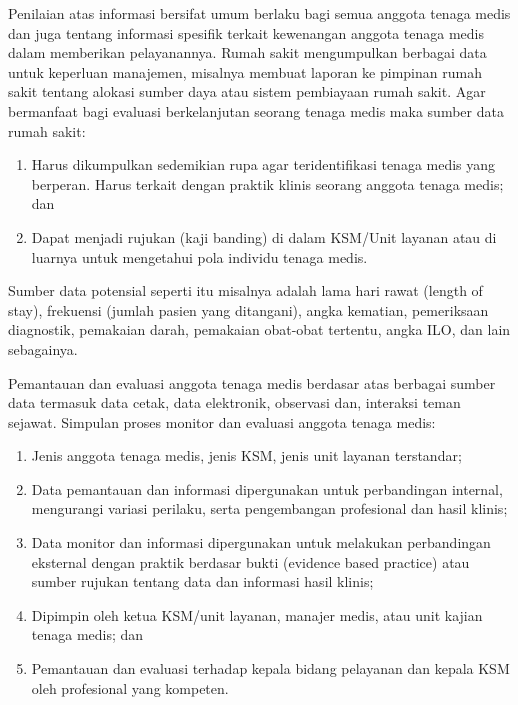 \documentclass[
]{book}
\providecommand{\tightlist}{%
  \setlength{\itemsep}{0pt}\setlength{\parskip}{0pt}}
\begin{document}
Penilaian atas informasi bersifat umum berlaku bagi semua anggota tenaga medis dan juga tentang informasi spesifik terkait kewenangan anggota tenaga medis dalam memberikan pelayanannya. Rumah sakit mengumpulkan berbagai data untuk keperluan manajemen, misalnya membuat laporan ke pimpinan rumah sakit tentang alokasi sumber daya atau sistem pembiayaan rumah sakit. Agar bermanfaat bagi evaluasi berkelanjutan seorang tenaga medis maka sumber data rumah sakit:

\begin{enumerate}
\def\labelenumi{\arabic{enumi}.}
\tightlist
\item
  Harus dikumpulkan sedemikian rupa agar teridentifikasi tenaga medis yang berperan. Harus terkait dengan praktik klinis seorang anggota tenaga medis; dan
\item
  Dapat menjadi rujukan (kaji banding) di dalam KSM/Unit layanan atau di luarnya untuk mengetahui pola individu tenaga medis.
\end{enumerate}

Sumber data potensial seperti itu misalnya adalah lama hari rawat (length of stay), frekuensi (jumlah pasien yang ditangani), angka kematian, pemeriksaan diagnostik, pemakaian darah, pemakaian obat-obat tertentu, angka ILO, dan lain sebagainya.

Pemantauan dan evaluasi anggota tenaga medis berdasar atas berbagai sumber data termasuk data cetak, data elektronik, observasi dan, interaksi teman sejawat. Simpulan proses monitor dan evaluasi anggota tenaga medis:

\begin{enumerate}
\def\labelenumi{\arabic{enumi}.}
\tightlist
\item
  Jenis anggota tenaga medis, jenis KSM, jenis unit layanan terstandar;
\item
  Data pemantauan dan informasi dipergunakan untuk perbandingan internal, mengurangi variasi perilaku, serta pengembangan profesional dan hasil klinis;
\item
  Data monitor dan informasi dipergunakan untuk melakukan perbandingan eksternal dengan praktik berdasar bukti (evidence based practice) atau sumber rujukan tentang data dan informasi hasil klinis;
\item
  Dipimpin oleh ketua KSM/unit layanan, manajer medis, atau unit kajian tenaga medis; dan
\item
  Pemantauan dan evaluasi terhadap kepala bidang pelayanan dan kepala KSM oleh profesional yang kompeten.
\end{enumerate}
\end{document}
